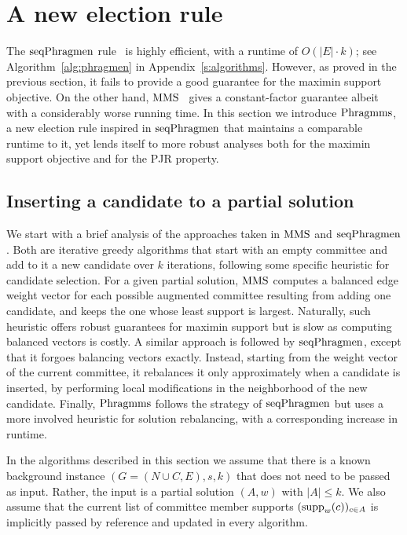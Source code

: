 \section{A new election rule}\label{s:heuristic}

The $\operatorname{seqPhragmen}$ rule~\cite{brill2017phragmen} is highly efficient, with a runtime of $O(|E|\cdot k)$; see Algorithm~\ref{alg:phragmen} in Appendix~\ref{s:algorithms}. 
However, as proved in the previous section, it fails to provide a good guarantee for the maximin support objective. 
On the other hand, $\operatorname{MMS}$~\cite{sanchez2016maximin} gives a constant-factor guarantee albeit with a considerably worse running time.
In this section we introduce $\operatorname{Phragmms}$, a new election rule inspired in $\operatorname{seqPhragmen}$ that maintains a comparable runtime to it, yet lends itself to more robust analyses both for the maximin support objective and for the PJR property. 

\subsection{Inserting a candidate to a partial solution}\label{s:inserting}

We start with a brief analysis of the approaches taken in $\operatorname{MMS}$ and $\operatorname{seqPhragmen}$. 
Both are iterative greedy algorithms that start with an empty committee and add to it a new candidate over $k$ iterations, following some specific heuristic for candidate selection.
For a given partial solution, $\operatorname{MMS}$ computes a balanced edge weight vector for each possible augmented committee resulting from adding one candidate, and keeps the one whose least support is largest. 
Naturally, such heuristic offers robust guarantees for maximin support but is slow as computing balanced vectors is costly. 
A similar approach is followed by $\operatorname{seqPhragmen}$, except that it forgoes balancing vectors exactly. Instead, starting from the weight vector of the current committee, it rebalances it only approximately when a candidate is inserted, by performing local modifications in the neighborhood of the new candidate. 
Finally, $\operatorname{Phragmms}$ follows the strategy of $\operatorname{seqPhragmen}$ but uses a more involved heuristic for solution rebalancing, with a corresponding increase in runtime. 

In the algorithms described in this section we assume that there is a known background instance $(G=(N\cup C, E), s, k)$ that does not need to be passed as input. Rather, the input is a partial solution $(A,w)$ with $|A|\leq k$. We also assume that the current list of committee member supports $(\operatorname{supp}_w(c))_{c\in A}$ is implicitly passed by reference and updated in every algorithm.

